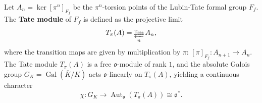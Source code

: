 Let $A_n = \ker[\pi^n]_{F_f}$ be the $\pi^n$-torsion points of the Lubin-Tate formal group $F_f$. The \textbf{Tate module} of $F_f$ is defined as the projective limit
$$
T_\pi(A) = \varprojlim_n A_n,
$$
where the transition maps are given by multiplication by $\pi$: $[\pi]_{F_f}: A_{n+1} \to A_n$. The Tate module $T_\pi(A)$ is a free $\mathfrak{o}$-module of rank $1$, and the absolute Galois group $G_K = \operatorname{Gal}(\overline{K}/K)$ acts $\mathfrak{o}$-linearly on $T_\pi(A)$, yielding a continuous character
$$
\chi: G_K \to \operatorname{Aut}_\mathfrak{o}(T_\pi(A)) \cong \mathfrak{o}^*.
$$
